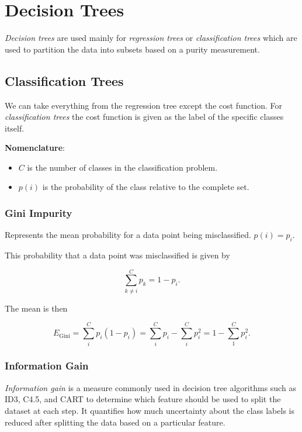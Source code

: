 \section{Decision Trees}

\emph{Decision trees} are used mainly for \emph{regression trees} or \emph{classification trees} which
are used to partition the data into subsets based on a purity measurement.

\subsection{Classification Trees}

We can take everything from the regression tree except the cost function. For
\emph{classification trees} the cost function is given as the label of the specific classes itself.

\textbf{Nomenclature}:

\begin{itemize}
	\item \(C\) is the number of classes in the classification problem.

	\item \(p(i)\) is the probability of the class relative to the complete set.
\end{itemize}

\subsubsection{Gini Impurity}

Represents the mean probability for a data point being misclassified. \(p(i) = p_i\).

This probability that a data point was misclassified is given by

\[
	\sum_{k \ne i}^{C} p_k = 1 - p_i.
\]

The mean is then

\[
	E_{\text{Gini}}= \sum_{i}^{C}p_i (1 - p_i) = \sum_{i}^{C} p_i - \sum_{i}^{C} p_{i}^2 = 1 - \sum_{1}^{C} p_{i}^{2}.
\]

\subsubsection{Information Gain}

\emph{Information gain} is a measure commonly used in decision tree algorithms such as ID3, C4.5, and CART to determine which feature should be used to split the dataset
at each step. It quantifies how much uncertainty about the class labels is reduced after
splitting the data based on a particular feature.

